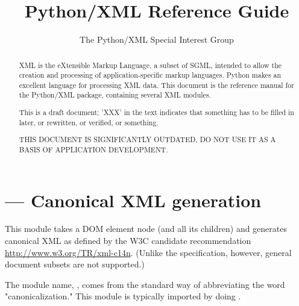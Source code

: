 \documentclass{howto}
\title{Python/XML Reference Guide}
\author{The Python/XML Special Interest Group}
\begin{document}
\maketitle

\begin{abstract}
\noindent
XML is the eXtensible Markup Language, a subset of SGML, intended to
allow the creation and processing of application-specific markup
languages.  Python makes an excellent language for processing XML
data.  This document is the reference manual for the Python/XML
package, containing several XML modules.

This is a draft document; 'XXX' in the text indicates that something
has to be filled in later, or rewritten, or verified, or something.  

   THIS DOCUMENT IS SIGNIFICANTLY OUTDATED, DO NOT USE IT AS A BASIS OF
   APPLICATION DEVELOPMENT.

\end{abstract}

\tableofcontents


\section{ ---
         Canonical XML generation}

This module takes a DOM element node (and all its children) and generates
canonical XML as defined by the W3C candidate recommendation
\url{http://www.w3.org/TR/xml-c14n}.
(Unlike the specification, however, general document subsets are not
supported.)

The module name, , comes from the standard way of abbreviating
the word "canonicalization."
This module is typically imported by doing
.
\end{document}
